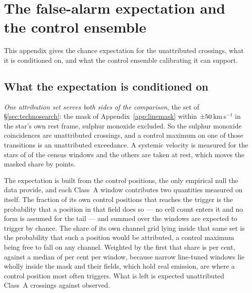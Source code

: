 \section{The false-alarm expectation and the control ensemble}
\label{app:falsealarm}

This appendix gives the chance expectation for the unattributed crossings,
what it is conditioned on, and what the control ensemble calibrating it can
support.

\subsection{What the expectation is conditioned on}

\emph{One attribution set serves both sides of the comparison}, the set of
\S\ref{sec:technosearch}: the mask of Appendix~\ref{app:linemask} within
$\pm50$\,km\,s$^{-1}$ in the star's own rest frame, sulphur monoxide
excluded. So the \MkNSODecide{} sulphur monoxide coincidences are unattributed
crossings, and a control maximum on one of those transitions is an
unattributed exceedance. A systemic velocity is measured for the stars of
\CeNVsys{} of the census windows and the others are taken at rest, which moves
the masked share by \CeVsysSensPct{} points.

The expectation is built from the control positions, the only empirical null
the data provide, and each Class~A window contributes two quantities
measured on itself. The fraction of its own \NCtrl{} control positions that
reaches the trigger is the probability that a position in that field does so
--- no cell count enters it and no form is assumed for the tail --- and
summed over the windows \CeExpTrig{} are expected to trigger by chance. The
share of its own channel grid lying inside that same set is the probability
that such a position would be attributed, a control maximum being free to
fall on any channel. Weighted by
the first that share is \CeMaskPct{} per cent, against a median of
\CeMaskPctMed{} per cent per window, because \CeNFullMask{} narrow
line-tuned windows lie wholly inside the mask and their fields, which hold
real emission, are where a control position most often triggers. What is
left is \CeExp{} expected unattributed Class~A crossings against \CeObs{}
observed.

